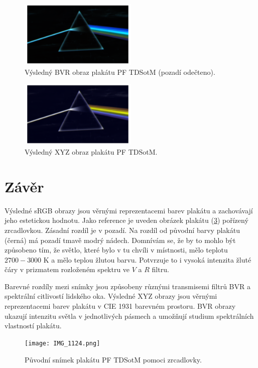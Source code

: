 \documentclass[a4paper,11pt,twocolumn]{article}
\begin{document}
        \begin{figure}
            \centering
            \includegraphics[width=0.5\textwidth]{pf_bvr}
            \caption{Výsledný BVR obraz plakátu PF TDSotM (pozadí odečteno).}
            \label{fig:pf_bvr}
        \end{figure}

        \begin{figure}
            \centering
            \includegraphics[width=0.5\textwidth]{pf_xyz}
            \caption{Výsledný XYZ obraz plakátu PF TDSotM.}
            \label{fig:pf_xyz}
        \end{figure}

    \section{Závěr}
        Výsledné sRGB obrazy jsou věrnými reprezentacemi barev plakátu a zachovávají jeho estetickou hodnotu. Jako reference je uveden obrázek plakátu (\ref{fig:original}) pořízený zrcadlovkou.  Zásadní rozdíl je v pozadí. Na rozdíl od původní barvy plakátu (černá) má pozadí tmavě modrý nádech. Domnívám se, že by to mohlo být způsobeno tím, že světlo, které bylo v tu chvíli v místnosti, mělo teplotu $2700-3000$ K a mělo teplou žlutou barvu. Potvrzuje to i vysoká intenzita žluté čáry v prizmatem rozloženém spektru ve $V$ a $R$ filtru. 
        
        Barevné rozdíly mezi snímky jsou způsobeny různými transmisemi filtrů BVR a spektrální citlivostí lidského oka. Výsledné XYZ obrazy jsou věrnými reprezentacemi barev plakátu v CIE 1931 barevném prostoru. BVR obrazy ukazují intenzitu světla v jednotlivých pásmech a umožňují studium spektrálních vlastností plakátu.

        \begin{figure}
            \centering
            \texttt{[image: IMG\_1124.png]}
            \caption{Původní snímek plakátu PF TDSotM pomoci zrcadlovky.}
            \label{fig:original}
        \end{figure}
    
    \newpage
    
    \nocite{*}
    
\end{document}
